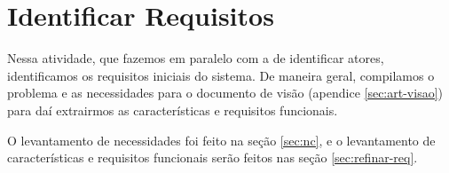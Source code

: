 \chapter{Identificar Requisitos}
\label{sec:requisitos}

Nessa atividade, que fazemos em paralelo com a de identificar atores, identificamos os requisitos iniciais do sistema. De maneira geral, compilamos o problema e as necessidades para o documento de visão (apendice \ref{sec:art-visao}) para daí extrairmos as características e requisitos funcionais.

O levantamento de necessidades foi feito na seção \ref{sec:nc}, e o levantamento de características e requisitos funcionais serão feitos nas seção \ref{sec:refinar-req}.

